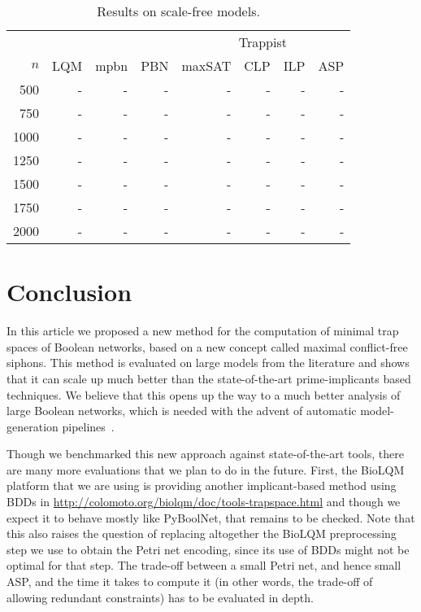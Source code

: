 \documentclass[preprint,12pt]{elsarticle}
\begin{document}
\begin{table}[!htb]
  \caption{Results on scale-free models.}
  \centering%
  \label{tab:result_scale_free}
  \begin{tabular}{rrrrrrrr}
    \toprule
    & & & & \multicolumn{4}{c}{Trappist}\\
    \cmidrule(rr){5-8}
    \(n\) & LQM & mpbn & PBN & maxSAT & CLP & ILP & ASP \\
    \midrule
    500 & - & - & - & - & - & - & - \\
    750 & - & - & - & - & - & - & - \\
    1000 & - & - & - & - & - & - & - \\
    1250 & - & - & - & - & - & - & - \\
    1500 & - & - & - & - & - & - & - \\
    1750 & - & - & - & - & - & - & - \\
    2000 & - & - & - & - & - & - & - \\
    \bottomrule
  \end{tabular}
\end{table}

\section{Conclusion}

In this article we proposed a new method for the computation of minimal trap spaces of Boolean networks, based on a new concept called maximal conflict-free siphons.
This method is evaluated on large models from the literature and shows that it can scale up much better than the state-of-the-art prime-implicants based techniques.
We believe that this opens up the way to a much better analysis of large Boolean networks, which is needed with the advent of automatic model-generation pipelines~\cite{ostaszewski2021covid19}.

Though we benchmarked this new approach against state-of-the-art tools, there are many more evaluations that we plan to do in the future.
First, the BioLQM platform that we are using is providing another implicant-based method using BDDs in \url{http://colomoto.org/biolqm/doc/tools-trapspace.html} and though we expect it to behave mostly like PyBoolNet, that remains to be checked.
Note that this also raises the question of replacing altogether the BioLQM preprocessing step we use to obtain the Petri net encoding, since its use of BDDs might not be optimal for that step.
The trade-off between a small Petri net, and hence small ASP, and the time it takes to compute it (in other words, the trade-off of allowing redundant constraints) has to be evaluated in depth.
\end{document}
